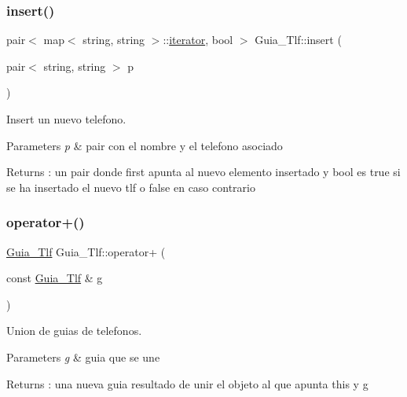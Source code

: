 \subsubsection{\texorpdfstring{insert()}{insert()}\hspace{0.1cm}{\footnotesize\ttfamily [2/2]}}
{\footnotesize\ttfamily pair$<$ map$<$ string, string $>$\+::\mbox{\hyperlink{classGuia__Tlf_1_1iterator}{iterator}}, bool $>$ Guia\+\_\+\+Tlf\+::insert (\begin{DoxyParamCaption}\item[{pair$<$ string, string $>$}]{p }\end{DoxyParamCaption})}



Insert un nuevo telefono. 


\begin{DoxyParams}{Parameters}
{\em p} & pair con el nombre y el telefono asociado\\
\hline
\end{DoxyParams}
\begin{DoxyReturn}{Returns}
\+: un pair donde first apunta al nuevo elemento insertado y bool es true si se ha insertado el nuevo tlf o false en caso contrario 
\end{DoxyReturn}
\mbox{\label{classGuia__Tlf_a3e0b08a1985d3c72853690730319172f}} 
\subsubsection{\texorpdfstring{operator+()}{operator+()}}
{\footnotesize\ttfamily \mbox{\hyperlink{classGuia__Tlf}{Guia\+\_\+\+Tlf}} Guia\+\_\+\+Tlf\+::operator+ (\begin{DoxyParamCaption}\item[{const \mbox{\hyperlink{classGuia__Tlf}{Guia\+\_\+\+Tlf}} \&}]{g }\end{DoxyParamCaption})}



Union de guias de telefonos. 


\begin{DoxyParams}{Parameters}
{\em g} & guia que se une \\
\hline
\end{DoxyParams}
\begin{DoxyReturn}{Returns}
\+: una nueva guia resultado de unir el objeto al que apunta this y g 
\end{DoxyReturn}
\mbox{\label{classGuia__Tlf_ac381d53f275ce769830e07fbc56902b0}} 

